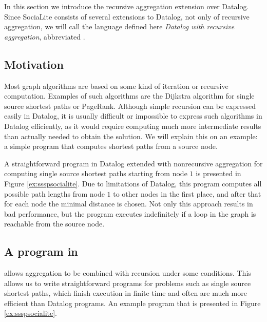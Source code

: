 In this section we introduce the recursive aggregation extension over Datalog. Since SociaLite consists of several extensions to Datalog, not only of recursive aggregation, we will call the language defined here \emph{Datalog with recursive aggregation}, abbreviated \datalogra.

\subsection{Motivation}
Most graph algorithms are based on some kind of iteration or recursive computation. Examples of such algorithms are the Dijkstra algorithm for single source shortest paths or PageRank. Although simple recursion can be expressed easily in Datalog, it is usually difficult or impossible to express such algorithms in Datalog efficiently, as it would require computing much more intermediate results than actually needed to obtain the solution. We will explain this on an example: a simple program that computes shortest paths from a source node.

A straightforward program in Datalog extended with nonrecursive aggregation for computing single source shortest paths starting from node $1$ is presented in Figure \ref{ex:ssspsocialite}. Due to limitations of Datalog, this program computes all possible path lengths from node $1$ to other nodes in the first place, and after that for each node the minimal distance is chosen. Not only this approach results in bad performance, but the program executes indefinitely if a loop in the graph is reachable from the source node.


\subsection{A program in \datalogra}

\datalogra allows aggregation to be combined with recursion under some conditions. This allows us to write straightforward programs for problems such as single source shortest paths, which finish execution in finite time and often are much more efficient than Datalog programs. An example \datalogra program that is presented in Figure \ref{ex:ssspsocialite}.


